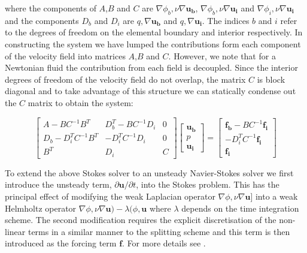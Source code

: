 where the components of $A$,$B$ and $C$ are
$\nabla\phi_b,\nu\nabla\boldsymbol{u_b}$,
$\nabla\phi_b,\nu\nabla\boldsymbol{u_i}$ and
$\nabla\phi_i,\nu\nabla\boldsymbol{u_i}$ and the components $D_b$ and
$D_i$ are $q,\nabla\boldsymbol{u_b}$ and $q,\nabla\boldsymbol{u_i}$.
The indices $b$ and $i$ refer to the degrees of freedom on the
elemental boundary and interior respectively. In constructing the
system we have lumped the contributions form each component of the
velocity field into matrices $A$,$B$ and $C$. However, we note that
for a Newtonian fluid the contribution from each field is
decoupled. Since the interior degrees of freedom of the velocity field
do not overlap, the matrix $C$ is block diagonal and to take advantage
of this structure we can statically condense out the $C$ matrix to
obtain the system:

\begin{equation}
\left[ \begin{array}{ccc}
 A-BC^{-1}B^T & D_b^T-BC^{-1}D_i & 0\\
 D_b-D_i^TC^{-1}B^T & -D_i^TC^{-1}D_i & 0\\
 B^T & D_i & C
 \end{array}\right]
 \left[ \begin{array}{c}
 \boldsymbol{u_b}\\
 p\\
 \boldsymbol{u_i}
 \end{array}\right] =
 \left[ \begin{array}{c}
 \boldsymbol{f_b} - BC^{-1}\boldsymbol{f_i}\\
 -D_i^TC^{-1}\boldsymbol{f_i}\\
 \boldsymbol{f_i}
 \end{array}\right]
 \end{equation}

 To extend the above Stokes solver to an unsteady Navier-Stokes solver
 we first introduce the unsteady term, $\partial
 \boldsymbol{u}/\partial t$, into the Stokes problem.  This has the
 principal effect of modifying the weak Laplacian operator
 $\nabla\phi,\nu\nabla\boldsymbol{u}$] into a weak Helmholtz operator
   $\nabla\phi,\nu\nabla\boldsymbol{u})-\lambda(\phi,\boldsymbol{u}$
   where $\lambda$ depends on the time integration scheme. The second
   modification requires the explicit discretisation of the non-linear
   terms in a similar manner to the splitting scheme and this term is
   then introduced as the forcing term $\boldsymbol{f}$. For more details see \cite{AiSh,ShAi}.



